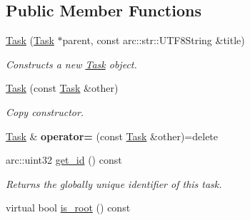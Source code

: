 \subsection*{Public Member Functions}
\begin{DoxyCompactItemize}
\item 
\hyperlink{classsigma_1_1core_1_1tasks_1_1_task_aad786cb04967106a10e79004bffbc5aa}{Task} (\hyperlink{classsigma_1_1core_1_1tasks_1_1_task}{Task} $\ast$parent, const arc\-::str\-::\-U\-T\-F8\-String \&title)
\begin{DoxyCompactList}\small\item\em Constructs a new \hyperlink{classsigma_1_1core_1_1tasks_1_1_task}{Task} object. \end{DoxyCompactList}\item 
\hyperlink{classsigma_1_1core_1_1tasks_1_1_task_a222255707537a07f64c687c87efef1e6}{Task} (const \hyperlink{classsigma_1_1core_1_1tasks_1_1_task}{Task} \&other)
\begin{DoxyCompactList}\small\item\em Copy constructor. \end{DoxyCompactList}\item 
\hypertarget{classsigma_1_1core_1_1tasks_1_1_task_a0deca6972a54102c60c212e0d5827d0b}{\hyperlink{classsigma_1_1core_1_1tasks_1_1_task}{Task} \& {\bfseries operator=} (const \hyperlink{classsigma_1_1core_1_1tasks_1_1_task}{Task} \&other)=delete}\label{classsigma_1_1core_1_1tasks_1_1_task_a0deca6972a54102c60c212e0d5827d0b}

\item 
arc\-::uint32 \hyperlink{classsigma_1_1core_1_1tasks_1_1_task_a967b192bba48756a7f031c91088bb0db}{get\-\_\-id} () const 
\begin{DoxyCompactList}\small\item\em Returns the globally unique identifier of this task. \end{DoxyCompactList}\item 
\hypertarget{classsigma_1_1core_1_1tasks_1_1_task_a615ceebc720367c0b26652163118bcb9}{virtual bool \hyperlink{classsigma_1_1core_1_1tasks_1_1_task_a615ceebc720367c0b26652163118bcb9}{is\-\_\-root} () const }\label{classsigma_1_1core_1_1tasks_1_1_task_a615ceebc720367c0b26652163118bcb9}


\end{DoxyCompactItemize}
